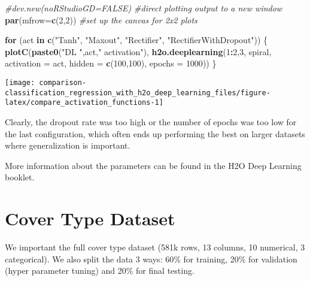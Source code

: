 \documentclass[]{book}
\newenvironment{Shaded}{\begin{snugshade}}{\end{snugshade}}
\newcommand{\CommentTok}[1]{\textcolor[rgb]{0.56,0.35,0.01}{\textit{#1}}}
\newcommand{\ControlFlowTok}[1]{\textcolor[rgb]{0.13,0.29,0.53}{\textbf{#1}}}
\newcommand{\DataTypeTok}[1]{\textcolor[rgb]{0.13,0.29,0.53}{#1}}
\newcommand{\DecValTok}[1]{\textcolor[rgb]{0.00,0.00,0.81}{#1}}
\newcommand{\KeywordTok}[1]{\textcolor[rgb]{0.13,0.29,0.53}{\textbf{#1}}}
\newcommand{\NormalTok}[1]{#1}
\newcommand{\OperatorTok}[1]{\textcolor[rgb]{0.81,0.36,0.00}{\textbf{#1}}}
\newcommand{\StringTok}[1]{\textcolor[rgb]{0.31,0.60,0.02}{#1}}
\begin{document}
\begin{Shaded}
\begin{Highlighting}[]
\CommentTok{#dev.new(noRStudioGD=FALSE) #direct plotting output to a new window}
\KeywordTok{par}\NormalTok{(}\DataTypeTok{mfrow=}\KeywordTok{c}\NormalTok{(}\DecValTok{2}\NormalTok{,}\DecValTok{2}\NormalTok{)) }\CommentTok{#set up the canvas for 2x2 plots}

\ControlFlowTok{for}\NormalTok{ (act }\ControlFlowTok{in} \KeywordTok{c}\NormalTok{(}\StringTok{"Tanh"}\NormalTok{, }\StringTok{"Maxout"}\NormalTok{, }\StringTok{"Rectifier"}\NormalTok{, }\StringTok{"RectifierWithDropout"}\NormalTok{)) \{}
  \KeywordTok{plotC}\NormalTok{(}\KeywordTok{paste0}\NormalTok{(}\StringTok{"DL "}\NormalTok{,act,}\StringTok{" activation"}\NormalTok{), }
        \KeywordTok{h2o.deeplearning}\NormalTok{(}\DecValTok{1}\OperatorTok{:}\DecValTok{2}\NormalTok{,}\DecValTok{3}\NormalTok{, spiral,}
              \DataTypeTok{activation =}\NormalTok{ act, }
              \DataTypeTok{hidden =} \KeywordTok{c}\NormalTok{(}\DecValTok{100}\NormalTok{,}\DecValTok{100}\NormalTok{), }
              \DataTypeTok{epochs =} \DecValTok{1000}\NormalTok{))}
\NormalTok{\}}
\end{Highlighting}
\end{Shaded}

\begin{center}\texttt{[image: comparison-classification\_regression\_with\_h2o\_deep\_learning\_files/figure-latex/compare\_activation\_functions-1]} \end{center}

Clearly, the dropout rate was too high or the number of epochs was too low for the last configuration, which often ends up performing the best on larger datasets where generalization is important.

More information about the parameters can be found in the H2O Deep Learning booklet.

\hypertarget{cover-type-dataset}{%
\section{Cover Type Dataset}\label{cover-type-dataset}}

We important the full cover type dataset (581k rows, 13 columns, 10 numerical, 3 categorical). We also split the data 3 ways: 60\% for training, 20\% for validation (hyper parameter tuning) and 20\% for final testing.
\end{document}

